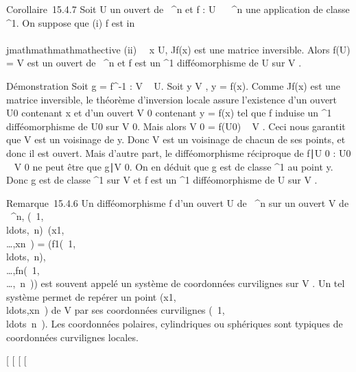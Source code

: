 Corollaire~15.4.7 Soit U un ouvert de ~^n et f : U \rightarrow~
~^n une application de classe ^1. On suppose que
(i) f est in\\\\jmathmathmathmathective (ii) \forall~~x \in U,
Jf(x) est une matrice inversible. Alors f(U) = V est un ouvert
de ~^n et f est un ^1 difféomorphisme de U sur V
.

Démonstration Soit g = f^-1 : V \rightarrow~ U. Soit y \in V , y = f(x).
Comme Jf(x) est une matrice inversible, le théorème
d'inversion locale assure l'existence d'un ouvert U0 contenant
x et d'un ouvert V 0 contenant y = f(x) tel que f induise un
^1 difféomorphisme de U0 sur V 0. Mais
alors V 0 = f(U0) \subset~ V . Ceci nous garantit que V est
un voisinage de y. Donc V est un voisinage de chacun de ses points, et
donc il est ouvert. Mais d'autre part, le difféomorphisme réciproque de
f∣U 0 :
U0 \rightarrow~ V 0 ne peut être que
g∣V 0. On en
déduit que g est de classe ^1 au point y. Donc g est de
classe ^1 sur V et f est un ^1 difféomorphisme
de U sur V .

Remarque~15.4.6 Un difféomorphisme f d'un ouvert U de ~^n sur
un ouvert V de ~^n,
(\alpha~1,\\ldots,\alpha~n)\mapsto~(x1,\\\ldots,xn~)
=
(f1(\alpha~1,\\ldots,\alpha~n),\\\ldots,fn(\alpha~1,\\\ldots,\alpha~n~))
est souvent appelé un système de coordonnées curvilignes sur V . Un tel
système permet de repérer un point
(x1,\\ldots,xn~)
de V par ses coordonnées curvilignes
(\alpha~1,\\ldots\alpha~n~).
Les coordonnées polaires, cylindriques ou sphériques sont typiques de
coordonnées curvilignes locales.

{[}
{[}
{[}
{[}
